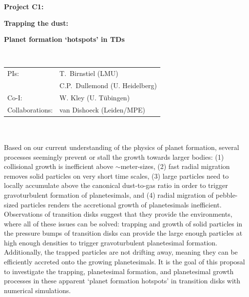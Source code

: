 \documentclass[10pt,fleqn,twoside]{article}
\begin{document}
\newpage


\setcounter{page}{1}

\centerline{\huge\bf\Tcol
%
%
%
%
%
 Project C1:}
\vspace{1em}

\centerline{\LARGE\bf\Tcol Trapping the dust:}\vspace{0.3em}
\centerline{\LARGE\bf\Tcol  Planet formation `hotspots' in TDs}

%
%
%
%
%
\vskip1.0cm


\\
\begin{tabular}{ll}
{\textsf{PIs:}}            & T.~Birnstiel (LMU) \\
                           & C.P.~Dullemond (U. Heidelberg)\\
{\textsf{Co-I:}}           & W. Kley (U. Tübingen) \\
{\textsf{Collaborations:}} & van Dishoeck (Leiden/MPE) \\

\end{tabular}


\vspace{1em}
 \\

\vspace{1em}
\\
Based on our current understanding of the physics of planet formation,
several processes seemingly prevent or stall the growth towards larger
bodies:
(1) collisional growth is inefficient above $\sim$meter-sizes,
(2) fast radial migration removes solid particles on very short time
scales,
(3) large particles need to locally accumulate above the canonical
dust-to-gas ratio in order to trigger gravoturbulent formation of
planetesimals, and
(4) radial migration of pebble-sized particles renders the accretional
growth of planetesimals inefficient.
Observations of transition disks suggest that they provide the
environments, where all of these issues can be solved: trapping and
growth of solid particles in the pressure bumps of transition disks
can provide the large enough particles at high enough densities to
trigger gravoturbulent planetesimal formation. Additionally, the
trapped particles are not drifting away, meaning they can be
efficiently accreted onto the growing planetesimals. It is the goal of
this proposal to investigate the trapping, planetesimal formation, and
planetesimal growth processes in these apparent `planet formation
hotspots' in transition disks with numerical simulations.
\end{document}
